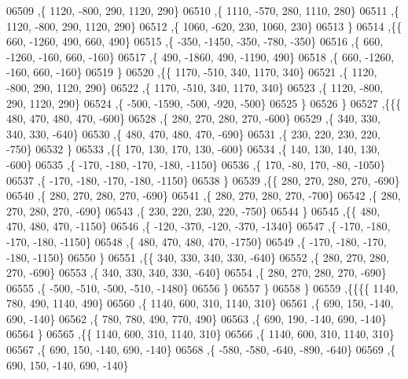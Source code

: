 \begin{DoxyCode}
06509     ,\{  1120,  -800,   290,  1120,   290\}
06510     ,\{  1110,  -570,   280,  1110,   280\}
06511     ,\{  1120,  -800,   290,  1120,   290\}
06512     ,\{  1060,  -620,   230,  1060,   230\}
06513     \}
06514    ,\{\{   660, -1260,   490,   660,   490\}
06515     ,\{  -350, -1450,  -350,  -780,  -350\}
06516     ,\{   660, -1260,  -160,   660,  -160\}
06517     ,\{   490, -1860,   490, -1190,   490\}
06518     ,\{   660, -1260,  -160,   660,  -160\}
06519     \}
06520    ,\{\{  1170,  -510,   340,  1170,   340\}
06521     ,\{  1120,  -800,   290,  1120,   290\}
06522     ,\{  1170,  -510,   340,  1170,   340\}
06523     ,\{  1120,  -800,   290,  1120,   290\}
06524     ,\{  -500, -1590,  -500,  -920,  -500\}
06525     \}
06526    \}
06527   ,\{\{\{   480,   470,   480,   470,  -600\}
06528     ,\{   280,   270,   280,   270,  -600\}
06529     ,\{   340,   330,   340,   330,  -640\}
06530     ,\{   480,   470,   480,   470,  -690\}
06531     ,\{   230,   220,   230,   220,  -750\}
06532     \}
06533    ,\{\{   170,   130,   170,   130,  -600\}
06534     ,\{   140,   130,   140,   130,  -600\}
06535     ,\{  -170,  -180,  -170,  -180, -1150\}
06536     ,\{   170,   -80,   170,   -80, -1050\}
06537     ,\{  -170,  -180,  -170,  -180, -1150\}
06538     \}
06539    ,\{\{   280,   270,   280,   270,  -690\}
06540     ,\{   280,   270,   280,   270,  -690\}
06541     ,\{   280,   270,   280,   270,  -700\}
06542     ,\{   280,   270,   280,   270,  -690\}
06543     ,\{   230,   220,   230,   220,  -750\}
06544     \}
06545    ,\{\{   480,   470,   480,   470, -1150\}
06546     ,\{  -120,  -370,  -120,  -370, -1340\}
06547     ,\{  -170,  -180,  -170,  -180, -1150\}
06548     ,\{   480,   470,   480,   470, -1750\}
06549     ,\{  -170,  -180,  -170,  -180, -1150\}
06550     \}
06551    ,\{\{   340,   330,   340,   330,  -640\}
06552     ,\{   280,   270,   280,   270,  -690\}
06553     ,\{   340,   330,   340,   330,  -640\}
06554     ,\{   280,   270,   280,   270,  -690\}
06555     ,\{  -500,  -510,  -500,  -510, -1480\}
06556     \}
06557    \}
06558   \}
06559  ,\{\{\{\{  1140,   780,   490,  1140,   490\}
06560     ,\{  1140,   600,   310,  1140,   310\}
06561     ,\{   690,   150,  -140,   690,  -140\}
06562     ,\{   780,   780,   490,   770,   490\}
06563     ,\{   690,   190,  -140,   690,  -140\}
06564     \}
06565    ,\{\{  1140,   600,   310,  1140,   310\}
06566     ,\{  1140,   600,   310,  1140,   310\}
06567     ,\{   690,   150,  -140,   690,  -140\}
06568     ,\{  -580,  -580,  -640,  -890,  -640\}
06569     ,\{   690,   150,  -140,   690,  -140\}

\end{DoxyCode}
